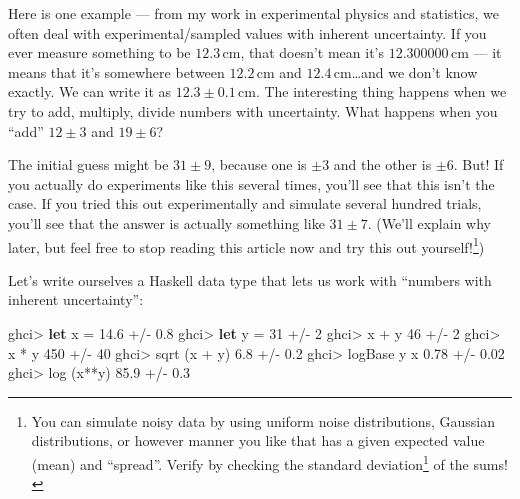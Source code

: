 \documentclass[]{article}
\newenvironment{Shaded}{}{}
\newcommand{\DecValTok}[1]{\textcolor[rgb]{0.25,0.63,0.44}{#1}}
\newcommand{\FloatTok}[1]{\textcolor[rgb]{0.25,0.63,0.44}{#1}}
\newcommand{\FunctionTok}[1]{\textcolor[rgb]{0.02,0.16,0.49}{#1}}
\newcommand{\KeywordTok}[1]{\textcolor[rgb]{0.00,0.44,0.13}{\textbf{#1}}}
\newcommand{\NormalTok}[1]{#1}
\newcommand{\OperatorTok}[1]{\textcolor[rgb]{0.40,0.40,0.40}{#1}}
\newcommand{\OtherTok}[1]{\textcolor[rgb]{0.00,0.44,0.13}{#1}}
\renewcommand{\href}[2]{#2\footnote{\url{#1}}}
\begin{document}
Here is one example --- from my work in experimental physics and statistics, we
often deal with experimental/sampled values with inherent uncertainty. If you
ever measure something to be \(12.3\,\mathrm{cm}\), that doesn't mean it's
\(12.300000\,\mathrm{cm}\) --- it means that it's somewhere between
\(12.2\,\mathrm{cm}\) and \(12.4\,\mathrm{cm}\)\ldots and we don't know exactly.
We can write it as \(12.3 \pm 0.1\,\mathrm{cm}\). The interesting thing happens
when we try to add, multiply, divide numbers with uncertainty. What happens when
you ``add'' \(12 \pm 3\) and \(19 \pm 6\)?

The initial guess might be \(31 \pm 9\), because one is \(\pm 3\) and the other
is \(\pm 6\). But! If you actually do experiments like this several times,
you'll see that this isn't the case. If you tried this out experimentally and
simulate several hundred trials, you'll see that the answer is actually
something like \(31 \pm 7\). (We'll explain why later, but feel free to stop
reading this article now and try this out yourself!\footnote{You can simulate
  noisy data by using uniform noise distributions, Gaussian distributions, or
  however manner you like that has a given expected value (mean) and ``spread''.
  Verify by checking the
  \href{https://en.wikipedia.org/wiki/Standard_deviation}{standard deviation} of
  the sums!})

Let's write ourselves a Haskell data type that lets us work with ``numbers with
inherent uncertainty'':

\begin{Shaded}
\begin{Highlighting}[]
\NormalTok{ghci}\OperatorTok{\textgreater{}} \KeywordTok{let}\NormalTok{ x }\OtherTok{=} \FloatTok{14.6} \OperatorTok{+/{-}} \FloatTok{0.8}
\NormalTok{ghci}\OperatorTok{\textgreater{}} \KeywordTok{let}\NormalTok{ y }\OtherTok{=} \DecValTok{31}   \OperatorTok{+/{-}} \DecValTok{2}
\NormalTok{ghci}\OperatorTok{\textgreater{}}\NormalTok{ x }\OperatorTok{+}\NormalTok{ y}
\DecValTok{46} \OperatorTok{+/{-}} \DecValTok{2}
\NormalTok{ghci}\OperatorTok{\textgreater{}}\NormalTok{ x }\OperatorTok{*}\NormalTok{ y}
\DecValTok{450} \OperatorTok{+/{-}} \DecValTok{40}
\NormalTok{ghci}\OperatorTok{\textgreater{}} \FunctionTok{sqrt}\NormalTok{ (x }\OperatorTok{+}\NormalTok{ y)}
\FloatTok{6.8} \OperatorTok{+/{-}} \FloatTok{0.2}
\NormalTok{ghci}\OperatorTok{\textgreater{}} \FunctionTok{logBase}\NormalTok{ y x}
\FloatTok{0.78} \OperatorTok{+/{-}} \FloatTok{0.02}
\NormalTok{ghci}\OperatorTok{\textgreater{}} \FunctionTok{log}\NormalTok{ (x}\OperatorTok{**}\NormalTok{y)}
\FloatTok{85.9} \OperatorTok{+/{-}} \FloatTok{0.3}
\end{Highlighting}
\end{Shaded}
\end{document}
